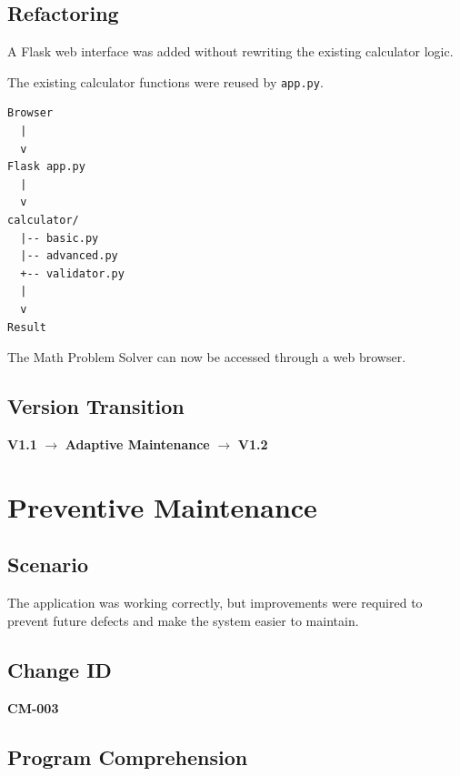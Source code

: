 \documentclass[12pt,a4paper,openany]{report}
\begin{document}
\section{Refactoring}

A Flask web interface was added without rewriting the existing
calculator logic.

The existing calculator functions were reused by \texttt{app.py}.

\begin{verbatim}
Browser
  |
  v
Flask app.py
  |
  v
calculator/
  |-- basic.py
  |-- advanced.py
  +-- validator.py
  |
  v
Result
\end{verbatim}

The Math Problem Solver can now be accessed through a web browser.

\section{Version Transition}

\begin{center}
\textbf{V1.1}
$\rightarrow$
\textbf{Adaptive Maintenance}
$\rightarrow$
\textbf{V1.2}
\end{center}


\chapter{Preventive Maintenance}

\section{Scenario}

The application was working correctly, but improvements were required
to prevent future defects and make the system easier to maintain.

\section{Change ID}

\textbf{CM-003}

\section{Program Comprehension}
\end{document}
